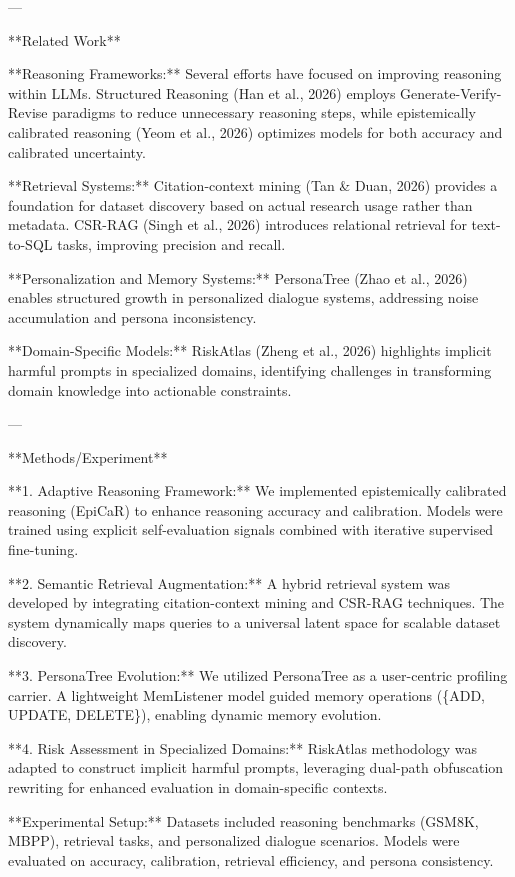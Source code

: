 ---

**Related Work**  

**Reasoning Frameworks:**  
Several efforts have focused on improving reasoning within LLMs. Structured Reasoning (Han et al., 2026) employs Generate-Verify-Revise paradigms to reduce unnecessary reasoning steps, while epistemically calibrated reasoning (Yeom et al., 2026) optimizes models for both accuracy and calibrated uncertainty.

**Retrieval Systems:**  
Citation-context mining (Tan & Duan, 2026) provides a foundation for dataset discovery based on actual research usage rather than metadata. CSR-RAG (Singh et al., 2026) introduces relational retrieval for text-to-SQL tasks, improving precision and recall.

**Personalization and Memory Systems:**  
PersonaTree (Zhao et al., 2026) enables structured growth in personalized dialogue systems, addressing noise accumulation and persona inconsistency.

**Domain-Specific Models:**  
RiskAtlas (Zheng et al., 2026) highlights implicit harmful prompts in specialized domains, identifying challenges in transforming domain knowledge into actionable constraints.

---

**Methods/Experiment**  

**1. Adaptive Reasoning Framework:**  
We implemented epistemically calibrated reasoning (EpiCaR) to enhance reasoning accuracy and calibration. Models were trained using explicit self-evaluation signals combined with iterative supervised fine-tuning.

**2. Semantic Retrieval Augmentation:**  
A hybrid retrieval system was developed by integrating citation-context mining and CSR-RAG techniques. The system dynamically maps queries to a universal latent space for scalable dataset discovery.

**3. PersonaTree Evolution:**  
We utilized PersonaTree as a user-centric profiling carrier. A lightweight MemListener model guided memory operations (\{ADD, UPDATE, DELETE\}), enabling dynamic memory evolution.

**4. Risk Assessment in Specialized Domains:**  
RiskAtlas methodology was adapted to construct implicit harmful prompts, leveraging dual-path obfuscation rewriting for enhanced evaluation in domain-specific contexts.

**Experimental Setup:**  
Datasets included reasoning benchmarks (GSM8K, MBPP), retrieval tasks, and personalized dialogue scenarios. Models were evaluated on accuracy, calibration, retrieval efficiency, and persona consistency.

